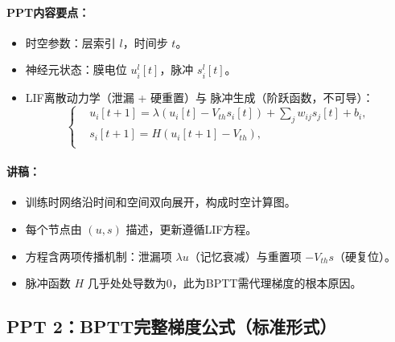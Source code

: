 \documentclass[journal,12pt,onecolumn]{IEEEtran}
\begin{document}
\paragraph{\textbf{PPT内容要点：}}
\begin{itemize}
    \item 时空参数：层索引 \(l\)，时间步 \(t\)。
    \item 神经元状态：膜电位 \(u_i^l[t]\)，脉冲 \(s_i^l[t]\)。
    \item LIF离散动力学（泄漏 + 硬重置）与 脉冲生成（阶跃函数，不可导）：
\begin{equation}
    \left\{
    \begin{aligned}
        &u_i\left[t + 1\right] = \lambda (u_i[t] - V_{th}s_i[t]) + \sum_j w_{ij}s_j[t] + b_i,\\
        &s_i[t + 1] = H(u_i\left[t+1\right] - V_{th}),\\
    \end{aligned}
    \right.
    \label{eq.discrete}
\end{equation}

\end{itemize}
\paragraph{\textbf{讲稿：}}
\begin{itemize}
    \item 训练时网络沿时间和空间双向展开，构成时空计算图。
    \item 每个节点由 \((u, s)\) 描述，更新遵循LIF方程。
    \item 方程含两项传播机制：泄漏项 \(\lambda u\)（记忆衰减）与重置项 \(-V_{th} s\)（硬复位）。
    \item 脉冲函数 \(H\) 几乎处处导数为0，此为BPTT需代理梯度的根本原因。
\end{itemize}

\subsection*{PPT 2：BPTT完整梯度公式（标准形式）}
\end{document}
